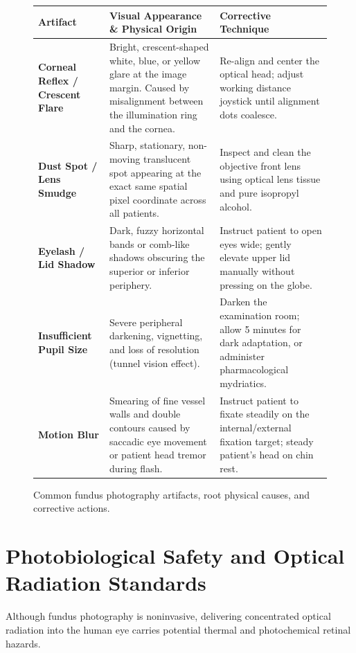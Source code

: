 \documentclass[11pt,a4paper]{article}
\begin{document}
\begin{figure}[htbp]
\centering
\setlength{\tabcolsep}{4pt}
\begin{tabular}{p{3.2cm}p{5.5cm}p{5.5cm}}
\toprule
\textbf{Artifact} & \textbf{Visual Appearance \& Physical Origin} & \textbf{Corrective Technique} \\
\midrule
\textbf{Corneal Reflex / Crescent Flare} & Bright, crescent-shaped white, blue, or yellow glare at the image margin. Caused by misalignment between the illumination ring and the cornea. & Re-align and center the optical head; adjust working distance joystick until alignment dots coalesce. \\
\addlinespace
\textbf{Dust Spot / Lens Smudge} & Sharp, stationary, non-moving translucent spot appearing at the exact same spatial pixel coordinate across all patients. & Inspect and clean the objective front lens using optical lens tissue and pure isopropyl alcohol. \\
\addlinespace
\textbf{Eyelash / Lid Shadow} & Dark, fuzzy horizontal bands or comb-like shadows obscuring the superior or inferior periphery. & Instruct patient to open eyes wide; gently elevate upper lid manually without pressing on the globe. \\
\addlinespace
\textbf{Insufficient Pupil Size} & Severe peripheral darkening, vignetting, and loss of resolution (tunnel vision effect). & Darken the examination room; allow 5 minutes for dark adaptation, or administer pharmacological mydriatics. \\
\addlinespace
\textbf{Motion Blur} & Smearing of fine vessel walls and double contours caused by saccadic eye movement or patient head tremor during flash. & Instruct patient to fixate steadily on the internal/external fixation target; steady patient's head on chin rest. \\
\bottomrule
\end{tabular}
\caption{Common fundus photography artifacts, root physical causes, and corrective actions.}
\label{tab:artifacts}
\end{figure}

\section{Photobiological Safety and Optical Radiation Standards}

Although fundus photography is noninvasive, delivering concentrated optical radiation into the human eye carries potential thermal and photochemical retinal hazards.
\end{document}
